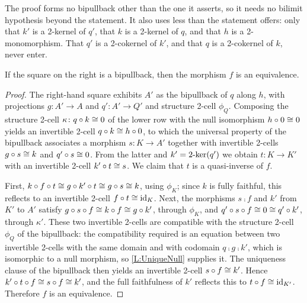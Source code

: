 \begin{remark}
  \label{Rem Left Pullback Cost}
  The proof forms no bipullback other than the one it asserts, so it needs no bilimit hypothesis beyond the statement. It also uses less than the statement offers: only that \(k'\) is a 2-kernel of \(q'\), that \(k\) is a 2-kernel of \(q\), and that \(h\) is a 2-monomorphism. That \(q'\) is a 2-cokernel of \(k'\), and that \(q\) is a 2-cokernel of \(k\), never enter.
\end{remark}

\begin{proposition}
  \label{Right Square Pullback}   \leanok
  If the square on the right is a bipullback, then the morphism \(f\) is an equivalence.
\end{proposition}

\begin{proof}
  \leanok
  The right-hand square exhibits \(A'\) as the bipullback of \(q\) along \(h\), with projections \(g\colon A'\to A\) and \(q'\colon A'\to Q'\) and structure 2-cell \(\phi_Q\). Composing the structure 2-cell \(\kappa\colon q\circ k\cong 0\) of the lower row with the null isomorphism \(h\circ 0\cong 0\) yields an invertible 2-cell \(q\circ k\cong h\circ 0\), to which the universal property of the bipullback associates a morphism \(s\colon K\to A'\) together with invertible 2-cells \(g\circ s\cong k\) and \(q'\circ s\cong 0\). From the latter and \(k'=2\text{-}\mathrm{ker}(q')\) we obtain \(t\colon K\to K'\) with an invertible 2-cell \(k'\circ t\cong s\). We claim that \(t\) is a quasi-inverse of \(f\).

	First, \(k\circ f\circ t\cong g\circ k'\circ t\cong g\circ s\cong k\), using \(\phi_K\); since \(k\) is fully faithful, this reflects to an invertible 2-cell \(f\circ t\cong\operatorname{id}_{K}\). Next, the morphisms \(s\comp f\) and \(k'\) from \(K'\) to \(A'\) satisfy \(g\circ s\circ f\cong k\circ f\cong g\circ k'\), through \(\phi_K\), and \(q'\circ s\circ f\cong 0\cong q'\circ k'\), through \(\kappa'\). These two invertible 2-cells are compatible with the structure 2-cell \(\phi_Q\) of the bipullback: the compatibility required is an equation between two invertible 2-cells with the same domain and with codomain \(q\comp g\comp k'\), which is isomorphic to a null morphism, so \lemx\ref{L:UniqueNull} supplies it. The uniqueness clause of the bipullback then yields an invertible 2-cell \(s\circ f\cong k'\). Hence \(k'\circ t\circ f\cong s\circ f\cong k'\), and the full faithfulness of \(k'\) reflects this to \(t\circ f\cong\operatorname{id}_{K'}\). Therefore \(f\) is an equivalence.
\end{proof}

